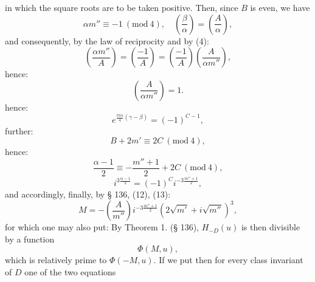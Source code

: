 in which the square roots are to be taken positive. Then, since $B$ is even, we have
\[
\alpha m'' \equiv -1 \ (\mathrm{mod}\ 4), \quad \left(\frac{\beta}{\alpha}\right)=\left(\frac{A}{\alpha}\right),
\]
and consequently, by the law of reciprocity and by (4):
\[
\left(\frac{\alpha m''}{A}\right) = \left(\frac{-1}{A}\right) = \left(\frac{-1}{A}\right)\left(\frac{A}{\alpha m''}\right),
\]
hence:
\[
\left(\frac{A}{\alpha m''}\right) = 1.
\]
hence:
\[
e^{\frac{\pi i \alpha}{4}(\gamma-\beta)} = (-1)^{C-1},
\]
further:
\[
B + 2m' \equiv 2C \ (\mathrm{mod}\ 4),
\]
hence:
\[
\frac{\alpha-1}{2} \equiv -\frac{m''+1}{2} + 2C \ (\mathrm{mod}\ 4),
\]
\[
i^{3\frac{\alpha-1}{2}} = (-1)^C i^{-3\frac{m''+1}{2}},
\]
and accordingly, finally, by § 136, (12), (13):
\[
M = -\left(\frac{A}{m''}\right) i^{-3\frac{m''+1}{2}} \left(2\sqrt{m'} + i\sqrt{m''}\right)^3, %
\]
for which one may also put:
By Theorem 1. (§ 136), $H_{-D}(u)$ is then divisible by a function
\[
\Phi(M,u),
\]
which is relatively prime to $\Phi(-M,u)$. If we put
then for every class invariant of $D$ one of the two equations
